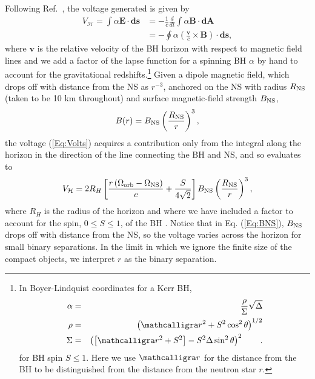 Following Ref.\ \cite{McL:2011}, the voltage generated is given by
\begin{align}
V_{\mathcal{H}} = \int{ \alpha \mathbf{E} \cdot \mathbf{ds} } &= 
%
- \frac{1}{c} \frac{d}{dt} \int{ \alpha   \mathbf{B} \cdot \mathbf{dA} } \nonumber \\
%
&= -\oint{ \alpha \left( \frac{\mathbf{v}}{c} \times \mathbf{B} \right) \cdot \mathbf{ds} },
\label{Eq:Volts}
\end{align}
where $\mathbf{v}$ is the relative velocity of the BH horizon with respect to magnetic field lines and we add a factor of the lapse function for a spinning BH $\alpha$
by hand to account for the gravitational redshifts.\footnote{In
  Boyer-Lindquist coordinates for a Kerr BH,
\begin{eqnarray}
\alpha &=& \frac{\rho}{\Sigma}\sqrt{\Delta} \\ \rho &=& \left (\rbh^2
+S^2\cos^2\theta \right )^{1/2} \nonumber \\ \Sigma &=& \left (\left
[\rbh^2+S^2\right ]-S^2\Delta \sin^2\theta \right )^2 \nonumber \quad
\quad .
\end{eqnarray}
for BH spin $S\le 1$. Here we use $\rbh$ for the distance from the BH
to be distinguished from the distance from the neutron star $r$.}
%
Given a dipole magnetic field, which drops off with distance from the
NS as $r^{-3}$, anchored on the NS with radius $R_{\rm NS}$ (taken to be 10 km throughout) and surface
magnetic-field strength $B_{\rm NS}$,
\begin{equation}
B(r)=B_{\rm NS}\left (\frac{R_{\rm NS}}{r}\right )^3,
\label{Eq:BNS}
\end{equation}
the voltage (\ref{Eq:Volts}) acquires a contribution only from the
integral along the horizon in the direction of the line connecting the
BH and NS, and so evaluates to
\begin{align}
\label{HVolt}
V_{\mathcal{H}} = 2 R_H \left[ \frac{r \left (\Omega_{\rm{orb}} - \Omega_{\rm
    NS} \right)}{c} + \frac{S}{4\sqrt{2}} \right] B_{\rm NS}
\left(\frac{R_{\rm NS}}{r} \right)^3,
\end{align} 
where $R_{H}$ is the radius of the horizon and where we have included
a factor to account for the spin, $0 \leq S \leq 1$, of the BH
\cite{McL:2011}. Notice that in Eq. (\ref{Eq:BNS}), $B_{\rm{NS}}$
drops off with distance from the NS, so the voltage varies across the
horizon for small binary separations. In the limit in which we ignore
the finite size of the compact objects, we interpret $r$ as the binary
separation.

